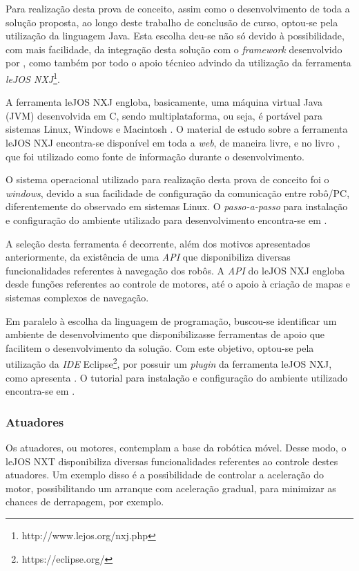 		Para realização desta prova de conceito, assim como o desenvolvimento de toda a solução proposta, ao longo deste trabalho de conclusão de curso,
		optou-se pela utilização da linguagem Java. Esta escolha deu-se não só devido à possibilidade, com mais facilidade, da integração
		desta solução com o \textit{framework} desenvolvido por \cite{tccRodrigo}, como também por todo o apoio técnico advindo da
		utilização da ferramenta \textit{leJOS NXJ}\footnote{http://www.lejos.org/nxj.php}.

		A ferramenta leJOS NXJ engloba, basicamente, uma máquina virtual Java (JVM) desenvolvida em C, sendo multiplataforma, ou seja,
		é portável para sistemas Linux, Windows e Macintosh \cite{legonxj}. O material de estudo sobre a ferramenta leJOS NXJ encontra-se
		disponível em toda a \textit{web}, de maneira livre, e no livro \cite{legonxj}, que foi utilizado como fonte de informação durante
		o desenvolvimento.

		O sistema operacional utilizado para realização desta prova de conceito foi o \textit{windows}, devido a sua facilidade de
		configuração da comunicação entre robô/PC, diferentemente do observado em sistemas Linux. O \textit{passo-a-passo} para instalação
		e configuração do ambiente utilizado para desenvolvimento encontra-se em \cite[p. 6]{legonxj}.

		A seleção desta ferramenta é decorrente, além dos motivos apresentados anteriormente, da existência de uma \textit{API} que
		disponibiliza diversas funcionalidades referentes à navegação dos robôs. A \textit{API} do leJOS NXJ engloba desde funções
		referentes ao controle de motores, até o apoio à criação de mapas e sistemas complexos de navegação.

		Em paralelo à escolha da linguagem de programação, buscou-se identificar um ambiente de desenvolvimento que disponibilizasse
		ferramentas de apoio que facilitem o desenvolvimento da solução. Com este objetivo, optou-se pela utilização da \textit{IDE}
		Eclipse\footnote{https://eclipse.org/}, por possuir um \textit{plugin} da ferramenta leJOS NXJ, como apresenta \cite{legonxj}.
		O tutorial para instalação e configuração do ambiente utilizado encontra-se em \cite[p. 14]{legonxj}.

	\subsubsection{Atuadores}

		Os atuadores, ou motores, contemplam a base da robótica móvel. Desse modo, o leJOS NXT disponibiliza diversas funcionalidades
		referentes ao controle destes atuadores. Um exemplo disso é a possibilidade de controlar a aceleração do motor, possibilitando
		um arranque com aceleração gradual, para minimizar as chances de derrapagem, por exemplo.

